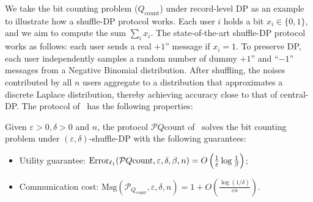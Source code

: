 \begin{example} 
\label{exm:Bit counting problem} 
We take the bit counting problem ($Q_\text{count}$) under record-level DP as an example to illustrate how a shuffle-DP protocol works. 
Each user $i$ holds a bit \( x_i \in \{0, 1\} \), and we aim to compute the sum $\sum_ix_i$. 
The state-of-the-art shuffle-DP protocol~\cite{ghazi2021differentially} works as follows: each user sends a real $+1$'' message if $x_i = 1$. 
To preserve DP, each user independently samples a random number of dummy $+1$'' and ``$-1$'' messages from a Negative Binomial distribution. 
After shuffling, the noises contributed by all $n$ users aggregate to a distribution that approximates a discrete Laplace distribution, thereby achieving accuracy close to that of central-DP. 
The protocol of~\cite{ghazi2021differentially} has the following properties: 
\begin{lemma}
\label{lem: Bit Counting Protocol} 
Given $\varepsilon >0, \delta>0$ and $n$, the protocol $\mathcal{P}{Q{\text{count}}}$ of~\cite{ghazi2021differentially} solves the bit counting problem under $(\varepsilon,\delta)$-shuffle-DP with the following guarantees: 
\begin{itemize} 
\item Utility guarantee: $\mathrm{Error}_{\ell_1}(\mathcal{P}{Q{\text{count}}}, \varepsilon, \delta, \beta,n)=O\left(\tfrac{1}{\varepsilon}\log\tfrac{1}{\beta}\right)$; 
\item Communication cost: $\mathrm{Msg}(\mathcal{P}_{Q_{\text{count}}}, \varepsilon, \delta, n)=1+{O}\left(\tfrac{\log(1/\delta)}{\varepsilon n}\right)$. 
\end{itemize} 
\end{lemma} 
\end{example}